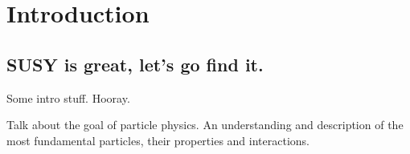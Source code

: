 
\chapter{Introduction}  %

\ifpdf
    \graphicspath{{Chapter1/Figs/Raster/}{Chapter1/Figs/PDF/}{Chapter1/Figs/}}
\else
    \graphicspath{{Chapter1/Figs/Vector/}{Chapter1/Figs/}}
\fi


\section{SUSY is great, let's go find it.}  %
\label{sec:introduction_intro}

Some intro stuff. Hooray.

Talk about the goal of particle physics.
    An understanding and description of the most fundamental particles, their 
    properties and interactions.